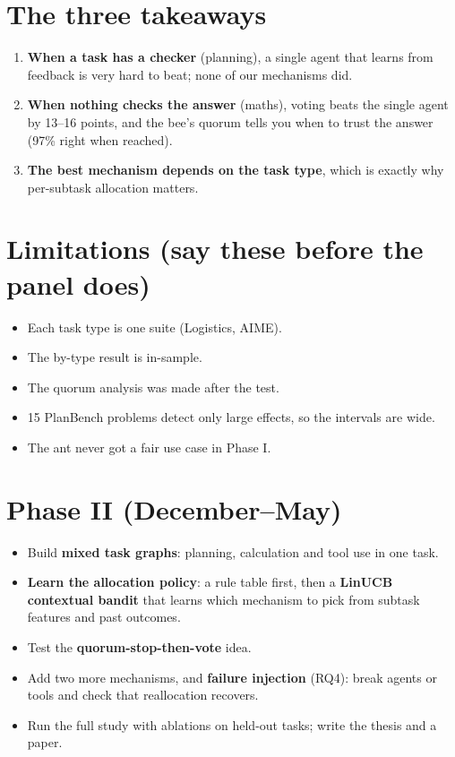 \documentclass[11pt,a4paper]{article}
\begin{document}
\section{The three takeaways}
\begin{enumerate}
  \item \textbf{When a task has a checker} (planning), a single agent that learns from feedback is very hard
        to beat; none of our mechanisms did.
  \item \textbf{When nothing checks the answer} (maths), voting beats the single agent by 13--16 points, and
        the bee's quorum tells you when to trust the answer (97\% right when reached).
  \item \textbf{The best mechanism depends on the task type}, which is exactly why per-subtask allocation matters.
\end{enumerate}

\section{Limitations (say these before the panel does)}
\begin{itemize}
  \item Each task type is one suite (Logistics, AIME).
  \item The by-type result is in-sample.
  \item The quorum analysis was made after the test.
  \item 15 PlanBench problems detect only large effects, so the intervals are wide.
  \item The ant never got a fair use case in Phase I.
\end{itemize}

\section{Phase II (December--May)}
\begin{itemize}
  \item Build \textbf{mixed task graphs}: planning, calculation and tool use in one task.
  \item \textbf{Learn the allocation policy}: a rule table first, then a \textbf{LinUCB contextual bandit}
        that learns which mechanism to pick from subtask features and past outcomes.
  \item Test the \textbf{quorum-stop-then-vote} idea.
  \item Add two more mechanisms, and \textbf{failure injection} (RQ4): break agents or tools and check that
        reallocation recovers.
  \item Run the full study with ablations on held-out tasks; write the thesis and a paper.
\end{itemize}
\end{document}
